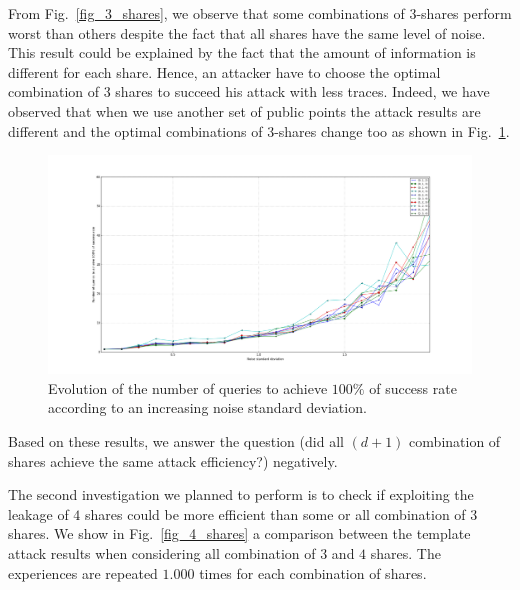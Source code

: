 \documentclass{llncs}
\begin{document}
From Fig.~\ref{fig_3_shares}, we observe that some combinations of $3$-shares perform worst than others despite the fact that all shares have the same level of noise. This result could be explained by the fact that the amount of information is different for each share. Hence, an attacker have to choose the optimal combination of $3$ shares to succeed his attack with less traces. Indeed, we have observed that when we use another set of public points the attack results are different and the optimal combinations of $3$-shares change too as shown in Fig.~\ref{fig_3_shares_bis}.    

\begin{figure}
\begin{center}
\includegraphics[width=1\textwidth]{Figure/res_86_23_115_107_189.png}
\caption{Evolution of the number of queries to achieve $100\%$ of success rate according to an increasing noise standard deviation.}
\label{fig_3_shares_bis}
\end{center}
\end{figure}

Based on these results, we answer the question (did all $(d+1)$ combination of shares achieve the same attack efficiency?) negatively.

The second investigation we planned to perform is to check if exploiting the leakage of $4$ shares could be more efficient than some or all combination of $3$ shares. We show in Fig.~\ref{fig_4_shares} a comparison between the template attack results when considering all combination of $3$ and $4$ shares. The experiences are repeated $1.000$ times for each combination of shares.
\end{document}
